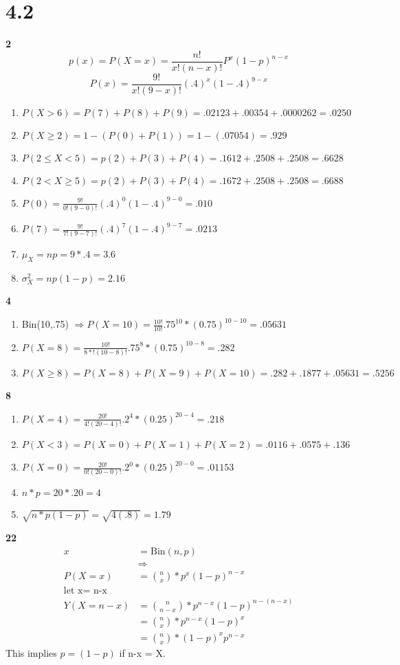 \documentclass[12pt]{report}
\begin{document}
\section*{4.2}
   {\bf 2}
        $$p(x)=P(X=x)=\frac{n!}{x!(n-x)!}P^x(1-p)^{n-x}$$
      $$P(x)=\frac{9!}{x!(9-x)!}(.4)^x(1-.4)^{9-x}$$
      \begin{enumerate}[label={\bf \alph*}]
        \item $P(X>6)=P(7)+P(8)+P(9)=.02123+.00354+.0000262=.0250$
        \item $P(X \geq 2)=1-(P(0)+P(1))=1-(.07054)=.929$
        \item $P(2 \leq X < 5) = p(2)+P(3)+P(4) =.1612+.2508+.2508=.6628$
        \item $P(2 < X \geq 5) = p(2)+P(3)+P(4) =.1672+.2508+.2508=.6688$
        \item $P(0)= \frac{9!}{0!(9-0)!}(.4)^0(1-.4)^{9-0}=.010$
        \item $P(7)= \frac{9!}{7!(9-7)!}(.4)^7(1-.4)^{9-7}=.0213$
        \item $\mu_X= np = 9*.4=3.6$
        \item $\sigma^2_X=np(1-p)=2.16$
      \end{enumerate}
   
   
   {\bf 4}
         \begin{enumerate}[label={\bf \alph*}]
         \item
         Bin(10,.75) $\Rightarrow P(X=10)=\frac{10!}{10!}.75^10*(0.75)^{10-10}=.05631$
         \item
         $P(X=8)=\frac{10!}{8*!(10-8)!}.75^8*(0.75)^{10-8}=.282$
         \item
         $P(X\geq 8) = P(X=8)+P(X=9)+P(X=10)=.282+.1877+.05631=.5256$
         \end{enumerate}
   
   
   {\bf 8}
            \begin{enumerate}[label={\bf \alph*}]
            \item $P(X=4)=\frac{20!}{4!(20-4)!}.2^4*(0.25)^{20-4}=.218$
            \item $P(X<3)=P(X=0)+P(X=1)+P(X=2)=.0116+.0575+.136$
            \item $P(X=0)=\frac{20!}{0!(20-0)!}.2^0*(0.25)^{20-0}=.01153$
            \item $n*p= 20*.20=4$
            \item $\sqrt{n*p(1-p)}=\sqrt{4(.8)}=1.79$
            \end{enumerate}
   {\bf 22}
      \begin{align*}
      x&=\text{Bin}(n,p)\\
       &\Rightarrow\\
       P(X=x)&={{n}\choose{x}}*p^{x}(1-p)^{n-x}\\
       \text{let x= n-x}\\
       Y(X=n-x)&={{n}\choose{n-x}}*p^{n-x}(1-p)^{n-(n-x)}\\
               &={{n}\choose{x}}*p^{n-x}(1-p)^{x}\\
               &={{n}\choose{x}}*(1-p)^{x}p^{n-x}
      \end{align*}
      This implies $p=(1-p)$ if n-x = X.
\end{document}
